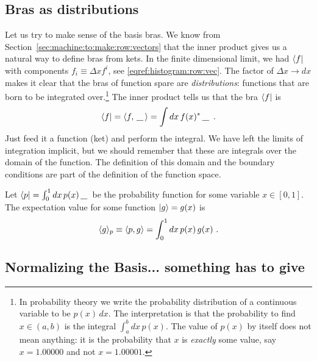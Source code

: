 \documentclass[12pt, oneside]{report}    %
\begin{document}
\subsection{Bras as distributions}

Let us try to make sense of the basis bras. We know from Section~\ref{sec:machine:to:make:row:vectors} that the inner product gives us a natural way to define bras from kets. In the finite dimensional limit, we had  $\left\langle f\right|$ with components $f_i\equiv \Delta x f^i$, see \eqref{eqref:histogram:row:vec}. The factor of $\Delta x \to dx$ makes it clear that the bras of function spare are \emph{distributions}: functions that are born to be integrated over.\footnote{In probability theory we write the probability distribution of a continuous variable to be $p(x)\,dx$. The interpretation is that the probability to find $x\in (a,b)$ is the integral $\int_a^b dx\, p(x)$. The value of $p(x)$ by itself does not mean anything: it is the probability that $x$ is \emph{exactly} some value, say $x=1.00000$ and not $x=1.00001$.} The inner product tells us that the bra $\left\langle f\right|$ is
\begin{align}
    \bra{f} = \la f, \smallslot \ra   = \int dx\, f(x)^* \smallslot \ .
\end{align}
Just feed it a function (ket) and perform the integral. We have left the limits of integration implicit, but we should remember that these are integrals over the domain of the function. The definition of this domain and the boundary conditions are part of the definition of the function space. 
\begin{example}
Let $ \bra{p}=\int_0^1 dx\, p(x)\smallslot$ be the probability function for some variable $x \in [0,1]$. The expectation value for some function $\left|g\right\rangle=g(x)$ is
\begin{align}
\langle g\rangle_p \equiv
     \langle p, g \rangle = \int_0^1 dx\, p(x)\,g(x) \ .
\end{align}
\end{example}

\subsection{Normalizing the Basis... something has to give}
\end{document}
